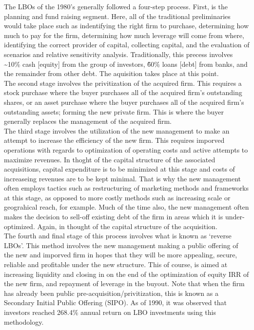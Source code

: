 \documentclass[11pt, english]{article}
\begin{document}
	The LBOs of the 1980's generally followed a four-step process. First, is the planning and fund raising segment. Here, all of the traditional preliminaries would take place such as indentifying the right firm to purchase, determining how much to pay for the firm, determining how much leverage will come from where, identifying the correct provider of capital, collecting capital, and the evaluation of scenarios and relative sensitivity analysis. Traditionally, this precess involves \~{}10\% cash [equity] from the group of investors, \~{60}\% loans [debt] from banks, and the remainder from other debt. The aquisition takes place at this point.\\

	The second stage involves the privitization of the acquired firm. This requires a stock purchase where the buyer purchases all of the acquired firm's outstanding shares, or an asset purchase where the buyer purchases all of the acquired firm's outstanding assets; forming the new private firm. This is where the buyer generally replaces the management of the acquired firm.\\

	The third stage involves the utilization of the new management to make an attempt to increase the efficiency of the new firm. This requires imporved operations with regards to optimization of operating costs and active attempts to maximize revenues. In thoght of the capital structure of the associated acquisitions, capital expenditure is to be minimized at this stage and costs of increaseing revenues are to be kept minimal. That is why the new management often employs tactics such as restructuring of marketing methods and frameworks at this stage, as opposed to more costly methods such as increasing scale or geograhical reach, for example. Much of the time also, the new management often makes the decision to sell-off existing debt of the firm in areas which it is under-optimized. Again, in thought of the capital structure of the acquisition.\\

	The fourth and final stage of this process involves what is known as `reverse LBOs'. This method involves the new management making a public offering of the new and imporved firm in hopes that they will be more appealing, secure, reliable and profitable under the new structure. This of course, is aimed at increasing liquidity and closing in on the end of the optimization of equity IRR of the new firm, and repayment of leverage in the buyout. Note that when the firm has already been public pre-acquisition/privitization, this is known as a Secondary Initial Public Offering (SIPO). As of 1990, it was observed that investors reached 268.4\% annual return on LBO investments using this methodology.
\end{document}
